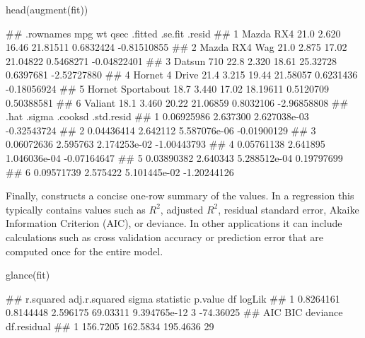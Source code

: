 \begin{example}
head(augment(fit))
\end{example}

\begin{example}
##           .rownames  mpg    wt  qsec  .fitted   .se.fit      .resid
## 1         Mazda RX4 21.0 2.620 16.46 21.81511 0.6832424 -0.81510855
## 2     Mazda RX4 Wag 21.0 2.875 17.02 21.04822 0.5468271 -0.04822401
## 3        Datsun 710 22.8 2.320 18.61 25.32728 0.6397681 -2.52727880
## 4    Hornet 4 Drive 21.4 3.215 19.44 21.58057 0.6231436 -0.18056924
## 5 Hornet Sportabout 18.7 3.440 17.02 18.19611 0.5120709  0.50388581
## 6           Valiant 18.1 3.460 20.22 21.06859 0.8032106 -2.96858808
##         .hat   .sigma      .cooksd  .std.resid
## 1 0.06925986 2.637300 2.627038e-03 -0.32543724
## 2 0.04436414 2.642112 5.587076e-06 -0.01900129
## 3 0.06072636 2.595763 2.174253e-02 -1.00443793
## 4 0.05761138 2.641895 1.046036e-04 -0.07164647
## 5 0.03890382 2.640343 5.288512e-04  0.19797699
## 6 0.09571739 2.575422 5.101445e-02 -1.20244126

\end{example}


Finally,  constructs a concise one-row summary of the  values. In a regression this typically contains values such as $R^2$, adjusted $R^2$, residual standard error, Akaike Information Criterion (AIC), or deviance. In other applications it can include calculations such as cross validation accuracy or prediction error that are computed once for the entire model.


\begin{example}
glance(fit)
\end{example}

\begin{example}
##   r.squared adj.r.squared    sigma statistic      p.value df    logLik
## 1 0.8264161     0.8144448 2.596175  69.03311 9.394765e-12  3 -74.36025
##        AIC      BIC deviance df.residual
## 1 156.7205 162.5834 195.4636          29

\end{example}





